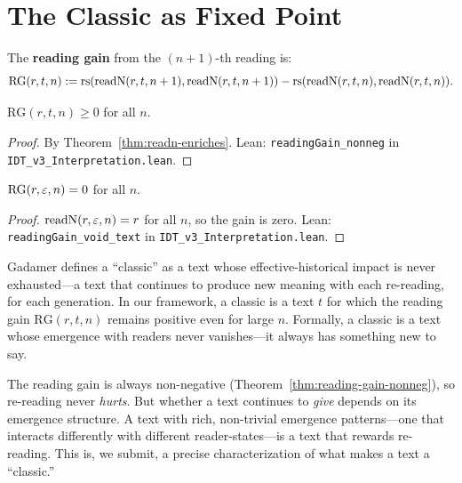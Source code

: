 \section{The Classic as Fixed Point}

\begin{definition}
\label{def:reading-gain}
The \textbf{reading gain} from the $(n+1)$-th reading is:
\[
\mathrm{RG}(r, t, n) := \mathrm{rs}(\mathrm{readN}(r,t,n+1), \mathrm{readN}(r,t,n+1))
- \mathrm{rs}(\mathrm{readN}(r,t,n), \mathrm{readN}(r,t,n)).
\]
\end{definition}

\begin{theorem}
\label{thm:reading-gain-nonneg}
$\mathrm{RG}(r, t, n) \geq 0$ for all $n$.
\end{theorem}

\begin{proof}
By Theorem~\ref{thm:readn-enriches}.
Lean: \texttt{readingGain\_nonneg} in \texttt{IDT\_v3\_Interpretation.lean}.
\end{proof}

\begin{theorem}
\label{thm:reading-gain-void}
$\mathrm{RG}(r, \varepsilon, n) = 0$ for all $n$.
\end{theorem}

\begin{proof}
$\mathrm{readN}(r, \varepsilon, n) = r$ for all $n$, so the gain is zero.
Lean: \texttt{readingGain\_void\_text} in \texttt{IDT\_v3\_Interpretation.lean}.
\end{proof}

\begin{interpretation}
\label{interp:classic}
Gadamer defines a ``classic'' as a text whose effective-historical impact
is never exhausted---a text that continues to produce new meaning with each
re-reading, for each generation. In our framework, a classic is a text $t$
for which the reading gain $\mathrm{RG}(r, t, n)$ remains positive even
for large $n$. Formally, a classic is a text whose emergence with readers
never vanishes---it always has something new to say.

The reading gain is always non-negative (Theorem~\ref{thm:reading-gain-nonneg}),
so re-reading never \emph{hurts}. But whether a text continues to \emph{give}
depends on its emergence structure. A text with rich, non-trivial emergence
patterns---one that interacts differently with different reader-states---is
a text that rewards re-reading. This is, we submit, a precise characterization
of what makes a text a ``classic.''
\end{interpretation}


